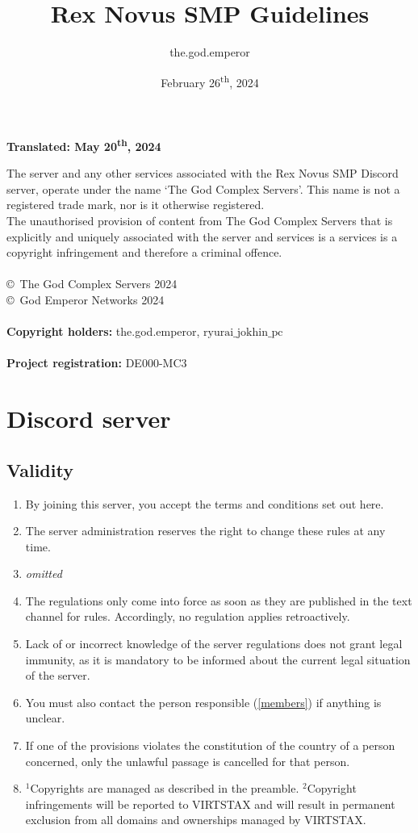 \documentclass{article}
\title{Rex Novus SMP Guidelines}
\author{the.god.emperor}
\date{February 26\textsuperscript{th}, 2024}
\begin{document}
\maketitle

\newpage
{}
\vspace*{\fill}
\begin{Center}
\textbf{Translated: May 20\textsuperscript{th}, 2024}
\vspace*{\fill}
\end{Center}
\newpage
The server and any other services associated with the Rex Novus SMP Discord server,
operate under the name `The God Complex Servers'. This name is not a registered trade mark, nor is it
otherwise registered.\\
The unauthorised provision of content from The God Complex Servers that is explicitly and uniquely associated with the server and services is a
services is a copyright infringement and therefore a criminal offence.
\\\\
\copyright\ The God Complex Servers 2024\\
\copyright\ God Emperor Networks 2024
\\\\
\textbf{Copyright holders: } 
the.god.emperor, $\text{ryurai\_jokhin\_pc}$
\\\\
\textbf{Project registration: }
DE000-MC3
\newpage
\tableofcontents
\newpage
\section{Discord server}
\subsection{Validity}
\begin{enumerate}[(1)]
	\item By joining this server, you accept the terms and conditions set out here.
	\item The server administration reserves the right to change these rules at any time.
	\item \textit{omitted}
	\item The regulations only come into force as soon as they are published in the text channel for rules. Accordingly, no regulation applies retroactively.
	\item Lack of or incorrect knowledge of the server regulations does not grant legal immunity, as it is mandatory to be informed about the current legal situation of the server.
	\item You must also contact the person responsible (\ref{members}) if anything is unclear.
	\item If one of the provisions violates the constitution of the country of a person concerned, only the unlawful passage is cancelled for that person.
	\item $^{1}$Copyrights are managed as described in the preamble. $^{2}$Copyright infringements will be reported to VIRTSTAX and will result in permanent exclusion from all domains and ownerships 
	managed by VIRTSTAX.
\end{enumerate}
\end{document}
